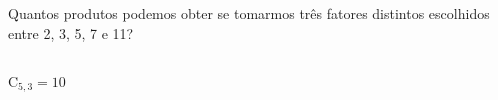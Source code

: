 \begin{ex}
 Quantos produtos podemos obter se tomarmos três fatores distintos escolhidos entre 2, 3, 5, 7 e 11?
   \begin{sol}
    \phantom{A} \\
    $\mathrm{C}_{5,3} =10$
   \end{sol}
\end{ex}